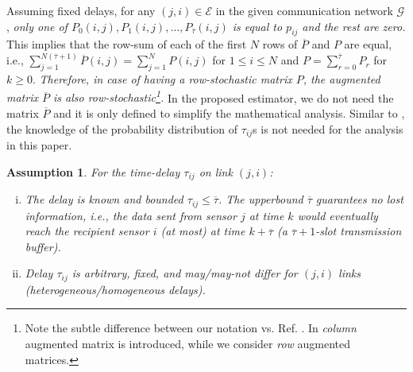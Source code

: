 \documentclass[journal]{IEEEtran}
\newcommand{\tb}{\color{blue}}
\newtheorem{ass}{Assumption}
\def\mc{\mathcal}
\begin{document}
Assuming fixed delays, for any $(j,i) \in \mc{E}$ in the given communication network $\mc{G}$, \textit{only one of $P_0(i,j),P_1(i,j), \hdots, P_{\overline{\tau}}(i,j)$ is  equal to  $p_{ij}$  and the rest are zero.} This implies that the row-sum of each of the first $N$ rows of $\overline{P}$ and $P$ are equal, i.e., $\sum_{j=1}^{N(\overline{\tau}+1)} \overline{P}(i,j) =  \sum_{j=1}^{N} {P}(i,j)$ for $1\leq i \leq N$ and $P = \sum_{r=0}^{\overline{\tau}} {P}_r$ for $k \geq 0$. \textit{Therefore, in case of having a row-stochastic matrix $P$, the augmented matrix $\overline{P}$ is also row-stochastic\footnote{Note the subtle difference between our notation vs. Ref. \cite{Themis_delay}. In \cite{Themis_delay} \textit{column} augmented matrix is introduced, while we consider \textit{row} augmented matrices.}.} In the proposed estimator, we do not need the matrix $\overline{P}$ and it is only defined to simplify the mathematical analysis. Similar to \cite{Themis_delay}, the knowledge of the probability distribution of $\tau_{ij}$s is not needed for the analysis in this paper.  
\begin{ass} \label{ass_tau}
	 For the time-delay $\tau_{ij}$ on  link $(j,i)$:
	 \begin{enumerate} [i)]
	 	\item 
	 	The delay is known and bounded $\tau_{ij} \leq \overline{\tau}$. %
	 	The upperbound $\overline{\tau}$ guarantees no lost information, i.e., the data sent from sensor $j$ at time
	 	$k$ would eventually reach the recipient sensor $i$ (at most) at time $k+\overline{\tau}$ (a $\overline{\tau}+1$-slot transmission buffer).
	 	\item Delay $\tau_{ij}$ is arbitrary, fixed, and  may/may-not differ for  $(j,i)$ links (heterogeneous/homogeneous delays). 
	 \end{enumerate}
\end{ass}
\end{document}

